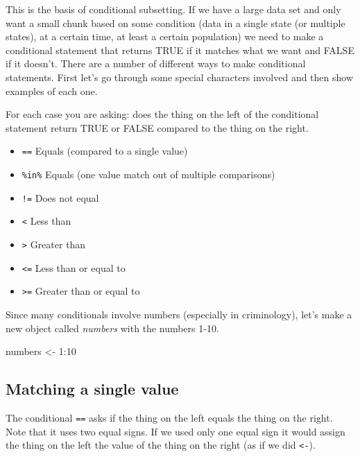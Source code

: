 \documentclass[
]{krantz}
\makeatletter
\newenvironment{Shaded}{\begin{snugshade}}{\end{snugshade}}
\newcommand{\DecValTok}[1]{\textcolor[rgb]{0.06,0.06,0.06}{#1}}
\newcommand{\NormalTok}[1]{#1}
\newcommand{\OtherTok}[1]{\textcolor[rgb]{0.37,0.37,0.37}{#1}}
\newcommand{\SpecialCharTok}[1]{\textcolor[rgb]{0,0,0}{#1}}
\providecommand{\tightlist}{%
  \setlength{\itemsep}{0pt}\setlength{\parskip}{0pt}}
\newenvironment{kframe}{%
\medskip{}
\setlength{\fboxsep}{.8em}
 \def\at@end@of@kframe{}%
 \ifinner\ifhmode%
  \def\at@end@of@kframe{\end{minipage}}%
  \begin{minipage}{\columnwidth}%
 \fi\fi%
 \def\FrameCommand##1{\hskip\@totalleftmargin \hskip-\fboxsep
 \colorbox{shadecolor}{##1}\hskip-\fboxsep
     \hskip-\linewidth \hskip-\@totalleftmargin \hskip\columnwidth}%
 \MakeFramed {\advance\hsize-\width
   \@totalleftmargin\z@ \linewidth\hsize
   \@setminipage}}%
 {\par\unskip\endMakeFramed%
 \at@end@of@kframe}
\renewenvironment{Shaded}{\begin{kframe}}{\end{kframe}}
\makeatother
\begin{document}
This is the basis of conditional subsetting. If we have a large data set and only want a small chunk based on some condition (data in a single state (or multiple states), at a certain time, at least a certain population) we need to make a conditional statement that returns TRUE if it matches what we want and FALSE if it doesn't. There are a number of different ways to make conditional statements. First let's go through some special characters involved and then show examples of each one.

For each case you are asking: does the thing on the left of the conditional statement return TRUE or FALSE compared to the thing on the right.

\begin{itemize}
\tightlist
\item
  \texttt{==} Equals (compared to a single value)
\item
  \texttt{\%in\%} Equals (one value match out of multiple comparisons)
\item
  \texttt{!=} Does not equal
\item
  \texttt{\textless{}} Less than
\item
  \texttt{\textgreater{}} Greater than
\item
  \texttt{\textless{}=} Less than or equal to
\item
  \texttt{\textgreater{}=} Greater than or equal to
\end{itemize}

Since many conditionals involve numbers (especially in criminology), let's make a new object called \emph{numbers} with the numbers 1-10.

\begin{Shaded}
\begin{Highlighting}[]
\NormalTok{numbers }\OtherTok{\textless{}{-}} \DecValTok{1}\SpecialCharTok{:}\DecValTok{10}
\end{Highlighting}
\end{Shaded}

\hypertarget{matching-a-single-value}{%
\subsection{Matching a single value}\label{matching-a-single-value}}

The conditional \texttt{==} asks if the thing on the left equals the thing on the right. Note that it uses two equal signs. If we used only one equal sign it would assign the thing on the left the value of the thing on the right (as if we did \texttt{\textless{}-}).
\end{document}
